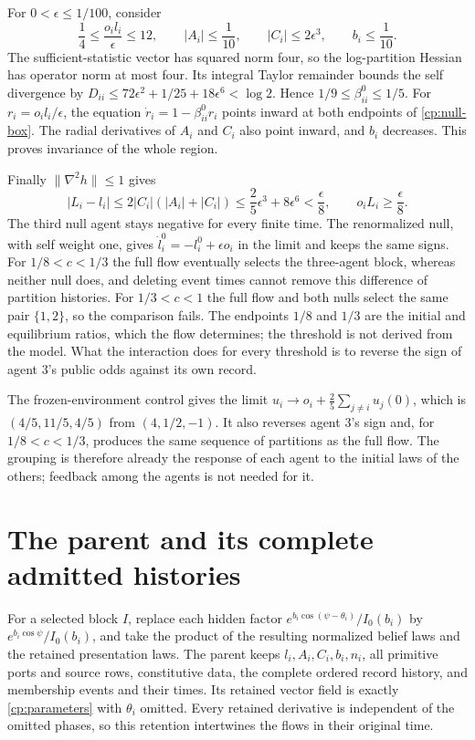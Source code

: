 For $0<\epsilon\leq1/100$, consider
\begin{equation}
 \frac14\leq\frac{o_il_i}{\epsilon}\leq12,\qquad
 |A_i|\leq\frac1{10},\qquad |C_i|\leq2\epsilon^3,\qquad
 b_i\leq\frac1{10}.
 \label{cp:null-box}
\end{equation}
The sufficient-statistic vector has squared norm four, so the log-partition Hessian has operator norm at most four. Its integral Taylor remainder bounds the self divergence by $D_{ii}\leq72\epsilon^2+1/25+18\epsilon^6<\log2$. Hence $1/9\leq\beta_{ii}^0\leq1/5$. For $r_i=o_il_i/\epsilon$, the equation $\dot r_i=1-\beta_{ii}^0r_i$ points inward at both endpoints of \cref{cp:null-box}. The radial derivatives of $A_i$ and $C_i$ also point inward, and $b_i$ decreases. This proves invariance of the whole region.

Finally $\|\nabla^2h\|\leq1$ gives
\begin{equation}
 |L_i-l_i|\leq2|C_i|(|A_i|+|C_i|)
 \leq\frac25\epsilon^3+8\epsilon^6<\frac\epsilon8,
 \qquad o_iL_i\geq\frac\epsilon8.
 \label{cp:null-signs}
\end{equation}
The third null agent stays negative for every finite time. The renormalized null, with self weight one, gives $\dot l_i^0=-l_i^0+\epsilon o_i$ in the limit and keeps the same signs. For $1/8<c<1/3$ the full flow eventually selects the three-agent block, whereas neither null does, and deleting event times cannot remove this difference of partition histories. For $1/3<c<1$ the full flow and both nulls select the same pair $\{1,2\}$, so the comparison fails. The endpoints $1/8$ and $1/3$ are the initial and equilibrium ratios, which the flow determines; the threshold is not derived from the model. What the interaction does for every threshold is to reverse the sign of agent $3$'s public odds against its own record.

The frozen-environment control gives the limit $u_i\to o_i+\frac25\sum_{j\ne i}u_j(0)$, which is $(4/5,11/5,4/5)$ from $(4,1/2,-1)$. It also reverses agent $3$'s sign and, for $1/8<c<1/3$, produces the same sequence of partitions as the full flow. The grouping is therefore already the response of each agent to the initial laws of the others; feedback among the agents is not needed for it.

\section{The parent and its complete admitted histories}

For a selected block $I$, replace each hidden factor $e^{b_i\cos(\psi-\theta_i)}/I_0(b_i)$ by $e^{b_i\cos\psi}/I_0(b_i)$, and take the product of the resulting normalized belief laws and the retained presentation laws. The parent keeps $l_i,A_i,C_i,b_i,n_i$, all primitive ports and source rows, constitutive data, the complete ordered record history, and membership events and their times. Its retained vector field is exactly \cref{cp:parameters} with $\theta_i$ omitted. Every retained derivative is independent of the omitted phases, so this retention intertwines the flows in their original time.

